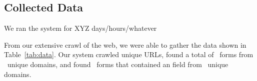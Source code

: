 \subsection{Collected Data}

We ran the system for XYZ days/hours/whatever 

From our extensive crawl of the web, we were able to gather the data
shown in Table~\ref{tab:data}. Our system crawled \urls unique URLs,
found a total of \forms\ forms from \uniqueforms\ unique domains, and
found \emailforms\ forms that contained an \email field from \uniqueemailforms\ unique domains.



